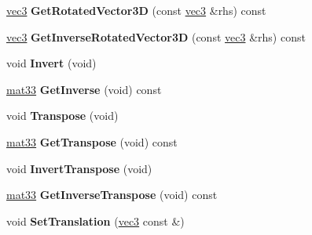 \begin{DoxyCompactItemize}
\item 
\hypertarget{classmath_1_1mat33_ae6f34b4710ac8b030a6bdc054d252393}{
\hyperlink{classmath_1_1vec3}{vec3} {\bfseries GetRotatedVector3D} (const \hyperlink{classmath_1_1vec3}{vec3} \&rhs) const }
\label{classmath_1_1mat33_ae6f34b4710ac8b030a6bdc054d252393}

\item 
\hypertarget{classmath_1_1mat33_ad51ef0edc0f292c152f84d789fab71d8}{
\hyperlink{classmath_1_1vec3}{vec3} {\bfseries GetInverseRotatedVector3D} (const \hyperlink{classmath_1_1vec3}{vec3} \&rhs) const }
\label{classmath_1_1mat33_ad51ef0edc0f292c152f84d789fab71d8}

\item 
\hypertarget{classmath_1_1mat33_a579ecdf322cce60f987d8e9ad78c89e5}{
void {\bfseries Invert} (void)}
\label{classmath_1_1mat33_a579ecdf322cce60f987d8e9ad78c89e5}

\item 
\hypertarget{classmath_1_1mat33_a17625c5cce1d6f0664bea6f9eeeed354}{
\hyperlink{classmath_1_1mat33}{mat33} {\bfseries GetInverse} (void) const }
\label{classmath_1_1mat33_a17625c5cce1d6f0664bea6f9eeeed354}

\item 
\hypertarget{classmath_1_1mat33_af1a3cbfd8342132a259f9b96b8c621f3}{
void {\bfseries Transpose} (void)}
\label{classmath_1_1mat33_af1a3cbfd8342132a259f9b96b8c621f3}

\item 
\hypertarget{classmath_1_1mat33_ace5dc31390092c96a38106ef9e12609a}{
\hyperlink{classmath_1_1mat33}{mat33} {\bfseries GetTranspose} (void) const }
\label{classmath_1_1mat33_ace5dc31390092c96a38106ef9e12609a}

\item 
\hypertarget{classmath_1_1mat33_acde640f132336a5fed17d0a954c4df79}{
void {\bfseries InvertTranspose} (void)}
\label{classmath_1_1mat33_acde640f132336a5fed17d0a954c4df79}

\item 
\hypertarget{classmath_1_1mat33_af2e48f188af637b737a4ccdad0a8e796}{
\hyperlink{classmath_1_1mat33}{mat33} {\bfseries GetInverseTranspose} (void) const }
\label{classmath_1_1mat33_af2e48f188af637b737a4ccdad0a8e796}

\item 
\hypertarget{classmath_1_1mat33_aa6c06fbc181d6eb0eea6487ac9e3fe3f}{
void {\bfseries SetTranslation} (\hyperlink{classmath_1_1vec3}{vec3} const \&)}
\label{classmath_1_1mat33_aa6c06fbc181d6eb0eea6487ac9e3fe3f}


\end{DoxyCompactItemize}
